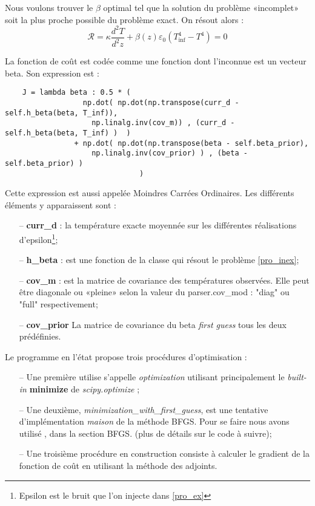 \documentclass[a4paper,12pt]{article}
\newcommand{\bepar}[1]{
	\left( #1 \right)  
}
\numberwithin{equation}{section} %
\begin{document}
\noindent Nous voulons trouver le $\beta$ optimal tel que la solution du problème «incomplet» soit la plus proche possible du problème exact. On résout alors : 
\begin{equation}
\mathcal{R} = \kappa \frac{d^2T}{d^2z} + \beta(z) \varepsilon_0 \bepar{T_{\text{inf}}^4 - T^4}  = 0 \label{pro_inex}
\end{equation}

\noindent La fonction de coût est codée comme une fonction dont l'inconnue est un vecteur beta. Son expression est \cite{parish2016paradigm, tarantola2005inverse}: 

\begin{lstlisting}
 	J = lambda beta : 0.5 * ( 
                  np.dot( np.dot(np.transpose(curr_d - self.h_beta(beta, T_inf)),
                    np.linalg.inv(cov_m)) , (curr_d - self.h_beta(beta, T_inf) )  )  
                + np.dot( np.dot(np.transpose(beta - self.beta_prior), 
                    np.linalg.inv(cov_prior) ) , (beta - self.beta_prior) ) 
                         	   )
\end{lstlisting}
\noindent Cette expression est aussi appelée Moindres Carrées Ordinaires. Les différents éléments y apparaissent sont : 
\begin{itemize}
\item[--]\textbf{curr\_d} : la température exacte moyennée sur les différentes réalisations d'epsilon\footnote{Epsilon est le bruit que l'on injecte dans \eqref{pro_ex}};
\item[--] \textbf{h\_beta} : est une fonction de la classe qui résout le problème \eqref{pro_inex};
\item[--] \textbf{cov\_m} : est la matrice de covariance des températures observées. Elle peut être diagonale ou «pleine» selon la valeur du parser.cov\_mod : "diag" ou "full" respectivement;
\item[--] \textbf{cov\_prior} La matrice de covariance du beta \textit{first guess} tous les deux prédéfinies.
\end{itemize}

\noindent Le programme en l'état propose trois procédures d'optimisation :
\begin{itemize}[leftmargin=2cm]
\item[--] Une première utilise s'appelle \textit{optimization} utilisant principalement le \textit{built-in} \textbf{minimize} de \textit{scipy.optimize} ;
\item[--] Une deuxième, \textit{minimization\_with\_first\_guess}, est une tentative d'implémentation \textit{maison} de la méthode BFGS. Pour se faire nous avons utilisé \cite{aria}, dans la section BFGS. (plus de détails sur le code à suivre);
\item[--] Une troisième procédure en construction consiste à calculer le gradient de la fonction de coût en utilisant la méthode des adjoints.
\end{itemize}
\end{document}
